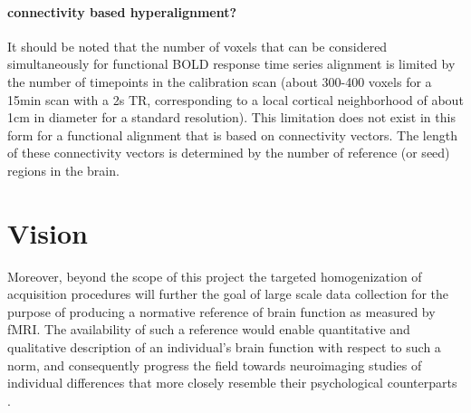 \paragraph{connectivity based hyperalignment?}
%
It should be noted that the number of voxels that can be considered
simultaneously for functional BOLD response time series alignment is limited by
the number of timepoints in the calibration scan (about 300-400 voxels for a
15min scan with a 2s TR, corresponding to a local cortical neighborhood of about
1cm in diameter for a standard resolution).
%
This limitation does not exist in this form for a functional alignment that is
based on connectivity vectors.
%
The length of these connectivity vectors is determined by the number of
reference (or seed) regions in the brain.


\section{Vision}
%
Moreover, beyond the scope of this project the targeted homogenization of
acquisition procedures will further the goal of large scale data collection for
the purpose of producing a normative reference of brain function as measured by
fMRI.
%
The availability of such a reference would enable quantitative and qualitative
description of an individual's brain function with respect to such a norm, and
consequently progress the field towards neuroimaging studies of individual
differences that more closely resemble their psychological counterparts
\citep{dubois2016building}.
